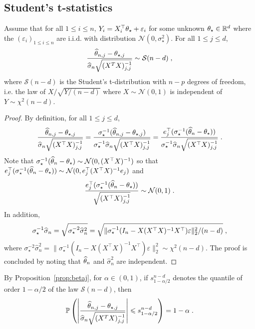 \subsection*{Student's t-statistics}
\begin{shaded}
\begin{proposition}
\label{prop:betaj}
Assume that  for all $1\leqslant i \leqslant n$, $Y_i = X^\top_i \theta_{\star} + \varepsilon_i$ for some unknown $\theta_\star\in\mathbb{R}^d$ where the $(\varepsilon_i)_{1\leqslant i\leqslant n}$ are i.i.d. with distribution $\mathcal{N}(0,\sigma_\star^2)$. For all $1\leqslant j \leqslant d$,
\[
\frac{\widehat {\theta}_{n,j} -\theta_{\star,j}}{\widehat\sigma_{n}\sqrt{(X^TX)_{j,j}^{-1}}} \sim \mathcal{S}(n-d)\;,
\]
where $\mathcal{S}(n-d)$ is the Student's t-distribution with $n-p$ degrees of freedom, i.e. the law of $X/\sqrt{Y/(n-d)}$ where $X\sim\mathcal{N}(0,1)$ is independent of $Y\sim\chi^2(n-d)$.
\end{proposition}
\end{shaded}
\begin{proof}
By definition, for all $1\leqslant j \leqslant d$,  
\[
\frac{\widehat {\theta}_{n,j} -\theta_{\star,j}}{\widehat\sigma_{n}\sqrt{(X^\top X)_{j,j}^{-1}}} = \frac{\sigma_\star^{-1}(\widehat {\theta}_{n,j} -\theta_{\star,j})}{\sigma_\star^{-1}\widehat\sigma_{n}\sqrt{(X^\top X)_{j,j}^{-1}}} = \frac{e^\top_j(\sigma_\star^{-1}(\widehat {\theta}_{n} -\theta_{\star}))}{\sigma_\star^{-1}\widehat\sigma_{n}\sqrt{(X^\top X)_{j,j}^{-1}}}\;.
\]
Note that $\sigma_\star^{-1}(\widehat {\theta}_{n} -\theta_{\star}) \sim \mathcal{N}(0,(X^\top X)^{-1})$ so that $e^\top_j(\sigma_\star^{-1}(\widehat {\theta}_{n} -\theta_{\star}))\sim \mathcal{N}(0,e^\top_j(X^\top X)^{-1}e_j)$ and 
\[
\frac{e^\top_j(\sigma_\star^{-1}(\widehat {\theta}_{n} -\theta_{\star}))}{\sqrt{(X^\top X)_{j,j}^{-1}}}\sim\mathcal{N}(0,1)\;.
\]
In addition,
\[
\sigma_\star^{-1}\widehat\sigma_{n} = \sqrt{\sigma_\star^{-2}\widehat\sigma^2_{n}} = \sqrt{\|\sigma_\star^{-1}(I_n - X(X^\top X)^{-1}X^\top)\varepsilon\|_2^2/(n-d)}\;,
\]
where $\sigma_\star^{-2}\widehat\sigma^2_{n} = \|\sigma_\star^{-1}(I_n - X(X^\top X)^{-1}X^\top)\varepsilon\|_2^2 \sim \chi^2(n-d)$. The proof is concluded by noting that $\widehat {\theta}_n$ and  $\widehat\sigma^2_{n}$ are independent.
\end{proof}
By Proposition~\ref{prop:betaj}, for $\alpha\in(0,1)$, if $s_{1-\alpha/2}^{n-d}$ denotes the quantile of order $1-\alpha/2$ of the law $\mathcal{S}(n-d)$, then 
\[
\mathbb{P}\left(\left|\frac{\widehat {\theta}_{n,j} -\theta_{\star,j}}{\widehat\sigma_{n}\sqrt{(X^TX)_{j,j}^{-1}}}\right| \leqslant s_{1-\alpha/2}^{n-d}\right) = 1-\alpha\;.
\]
